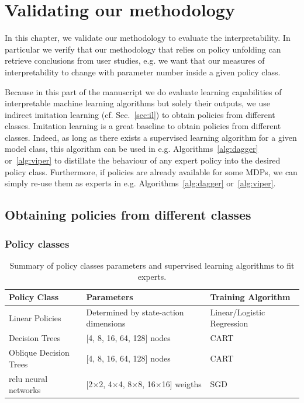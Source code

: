 \chapter{Validating our methodology}\label{sec:exps1}

In this chapter, we validate our methodology to evaluate the interpretability.
In particular we verify that our methodology that relies on policy unfolding can retrieve conclusions from user studies, e.g. we want that our measures of interpretability to change with parameter number inside a given policy class.

Because in this part of the manuscript we do evaluate learning capabilities of interpretable machine learning algorithms but solely their outputs, we use indirect imitation learning (cf. Sec.~\ref{sec:il}) to obtain policies from different classes.
Imitation learning is a great baseline to obtain policies from different classes.
Indeed, as long as there exists a supervised learning algorithm for a given model class, this algorithm can be used in e.g. Algorithms~\ref{alg:dagger} or~\ref{alg:viper} to distillate the behaviour of any expert policy into the desired policy class. 
Furthermore, if policies are already available for some MDPs, we can simply re-use them as experts in e.g. Algorithms~\ref{alg:dagger} or~\ref{alg:viper}.

\section{Obtaining policies from different classes}

\subsection{Policy classes}
\begin{table}[ht]
\centering
\small
\begin{tabular}{lll}
\hline
\textbf{Policy Class} & \textbf{Parameters} & \textbf{Training Algorithm} \\
\hline
Linear Policies & Determined by state-action dimensions & Linear/Logistic Regression \\
Decision Trees & [4, 8, 16, 64, 128] nodes & CART \\
Oblique Decision Trees & [4, 8, 16, 64, 128] nodes & CART \\
relu neural networks & [2$\times$2, 4$\times$4, 8$\times$8, 16$\times$16] weigths & SGD \\
\hline
\end{tabular}
\caption{Summary of policy classes parameters and supervised learning algorithms to fit experts.}
\label{tab:policy-classes}
\end{table}

